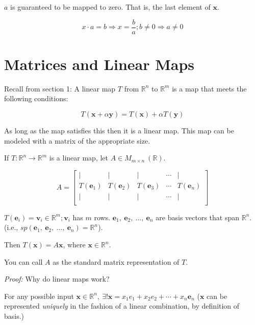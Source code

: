 \documentclass[
]{article}
\begin{document}
$a$ is guaranteed to be mapped to zero. That is, the last element of
$\mathbf{x}$.

$$x \cdot a = b \Rightarrow x = \frac{b}{a};b \neq 0 \Rightarrow a \neq 0$$


\section{Matrices and Linear Maps}

Recall from section 1: A linear map $T$ from $\mathbb{R}^{n}$ to
$\mathbb{R}^{m}$ is a map that meets the following conditions:

$$T\left( \mathbf{x} + \alpha\mathbf{y} \right) = T\left( \mathbf{x} \right) + \alpha T(\mathbf{y})$$

As long as the map satisfies this then it is a linear map. This map can
be modeled with a matrix of the appropriate size.

If $T:\mathbb{R}^{n} \rightarrow \mathbb{R}^{m}$ is a linear map, let
$A \in M_{m \times n}\ \left( \mathbb{R} \right)$.

$$A = \begin{bmatrix}
 \mid & \mid & \mid & \cdots & \mid \\
T({\mathbf{e}}_{1}) & T({\mathbf{e}}_{2}) & T({\mathbf{e}}_{3}) & \cdots & T({\mathbf{e}}_{n}) \\
 \mid & \mid & \mid & \cdots & \mid \\
\end{bmatrix}$$

$T\left( {\mathbf{e}}_{i} \right) = {\mathbf{v}}_{i} \in \mathbb{R}^{m};{\mathbf{v}}_{i}$
has $m$ rows.
${\mathbf{e}}_{1},\ {\mathbf{e}}_{2},\ \ldots,\ {\mathbf{e}}_{n}$
are basis vectors that span $\mathbb{R}^{n}$. (i.e.,
$sp\left( {\mathbf{e}}_{1},\ {\mathbf{e}}_{2},\ \ldots,\ {\mathbf{e}}_{n} \right) = \mathbb{R}^{n}$).

Then $T\left( \mathbf{x} \right) = A\mathbf{x}$, where
$\mathbf{x} \in \mathbb{R}^{n}$.

You can call $A$ as the standard matrix representation of $T$.

\emph{Proof:} Why do linear maps work?

For any possible input
$\mathbf{x} \in \mathbb{R}^{n},\ \exists!\mathbf{x} = x_{1}e_{1} + x_{2}e_{2} + \cdots + x_{n}{\mathbf{e}}_{n}$
($\mathbf{x}$ can be represented \emph{uniquely} in the fashion of
a linear combination, by definition of basis.)
\end{document}

